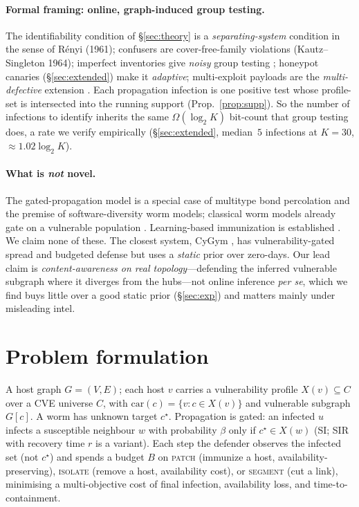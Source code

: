 \documentclass[11pt]{article}
\newcommand{\carriers}{\mathrm{car}}
\begin{document}
\paragraph{Formal framing: online, graph-induced group testing.}
The identifiability condition of \S\ref{sec:theory} is a \emph{separating-system}
condition in the sense of R\'enyi (1961); confusers are cover-free-family
violations (Kautz--Singleton 1964); imperfect inventories give \emph{noisy}
group testing \citep{atia2012boolean}; honeypot canaries
(\S\ref{sec:extended}) make it \emph{adaptive}; multi-exploit payloads are the
\emph{multi-defective} extension \citep{aldridge2019grouptesting}. Each
propagation infection is one positive test whose profile-set is intersected into
the running support (Prop.~\ref{prop:supp}). So the number of infections to
identify inherits the same $\Omega(\log_2 K)$ bit-count that group testing does,
a rate we verify empirically (\S\ref{sec:extended}, median~$5$ infections at
$K{=}30$, $\approx\!1.02\log_2 K$).

\paragraph{What is \emph{not} novel.} The gated-propagation model is a special
case of multitype bond percolation \citep{allard2009multitype} and the premise of
software-diversity worm models; classical worm models already gate on a
vulnerable population \citep{chen2003aawp,staniford2002own}. Learning-based
immunization is established \citep{meirom2021rlgn,fan2020finder}. We claim none of
these. The closest system, CyGym \citep{cygym2025}, has vulnerability-gated spread
and budgeted defense but uses a \emph{static} prior over zero-days. Our lead claim
is \emph{content-awareness on real topology}---defending the inferred vulnerable
subgraph where it diverges from the hubs---not online inference \emph{per se},
which we find buys little over a good static prior (\S\ref{sec:exp}) and matters
mainly under misleading intel.

\section{Problem formulation}\label{sec:formulation}
A host graph $G=(V,E)$; each host $v$ carries a vulnerability profile
$X(v)\subseteq C$ over a CVE universe $C$, with $\carriers(c)=\{v: c\in X(v)\}$
and vulnerable subgraph $G[c]$. A worm has unknown target $c^\star$. Propagation
is gated: an infected $u$ infects a susceptible neighbour $w$ with probability
$\beta$ only if $c^\star\in X(w)$ (SI; SIR with recovery time $r$ is a variant).
Each step the defender observes the infected set (not $c^\star$) and spends a
budget $B$ on \textsc{patch} (immunize a host, availability-preserving),
\textsc{isolate} (remove a host, availability cost), or \textsc{segment} (cut a
link), minimising a multi-objective cost of final infection, availability loss,
and time-to-containment.
\end{document}
